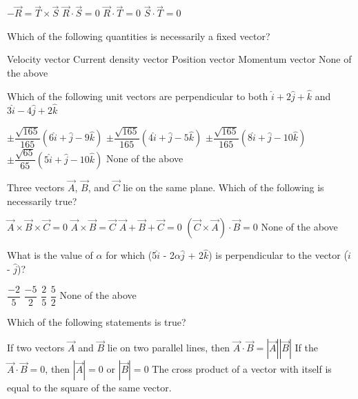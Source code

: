 \documentclass[12pt,addpoints]{exam}
\begin{document}
{{{\begin{questions}
\begin{oneparchoices}
						\choice $-\vec{R}=\vec{T}\times\vec{S}$
						\choice $\vec{R}\cdot\vec{S}=0$
						\choice $\vec{R}\cdot\vec{T}=0$
						\choice $\vec{S}\cdot\vec{T}=0$
					\end{oneparchoices}
					\question Which of the following quantities is necessarily a fixed vector? \\
					\begin{oneparchoices}
						\choice Velocity vector
						\choice Current density vector
						\choice Position vector
						\choice Momentum vector
						\choice None of the above
					\end{oneparchoices}
					\question Which of the following unit vectors are perpendicular to both $\hat{i}+2\hat{j}+\hat{k}$ and $3\hat{i}-4\hat{j}+2\hat{k}$
					\begin{oneparchoices}
						\choice $\pm\dfrac{\sqrt{165}}{165}(6\hat{i}+\hat{j}-9\hat{k})$
						\choice $\pm\dfrac{\sqrt{165}}{165}(4\hat{i}+\hat{j}-5\hat{k})$
						\choice $\pm\dfrac{\sqrt{165}}{165}(8\hat{i}+\hat{j}-10\hat{k})$
						\choice $\pm\dfrac{\sqrt{65}}{65}(5\hat{i}+\hat{j}-10\hat{k})$
						\choice None of the above
					\end{oneparchoices}
					\question Three vectors $\vec{A}$, $\vec{B}$, and $\vec{C}$ lie on the same plane. Which of the following is necessarily true?
					\begin{oneparchoices}
						\choice $\vec{A}\times\vec{B}\times\vec{C}=0$
						\choice $\vec{A}\times\vec{B}=\vec{C}$
						\choice $\vec{A}+\vec{B}+\vec{C}=0$
						\choice $(\vec{C}\times\vec{A})\cdot\vec{B}=0$
						\choice None of the above
					\end{oneparchoices}
					\question What is the value of $\alpha$ for which (5$\hat{i}$ - 2$\alpha$$\hat{j}$ + 2$\hat{k}$) is perpendicular to the vector ($\hat{i}$ - $\hat{j}$)? \\
					\begin{oneparchoices}
						\choice $\dfrac{-2}{5}$
						\choice $\dfrac{-5}{2}$
						\choice $\dfrac{2}{5}$
						\choice $\dfrac{5}{2}$
						\choice None of the above
					\end{oneparchoices} 
					\question Which of the following statements is true?
					\begin{choices}
						\choice If two vectors $\vec{A}$ and $\vec{B}$ lie on two parallel lines, then $\vec{A}\cdot\vec{B}=|\vec{A}||\vec{B}|$
						\choice If the $\vec{A}\cdot\vec{B}=0$, then $|\vec{A}|=0$ or $|\vec{B}|=0$
						\choice The cross product of a vector with itself is equal to the
						square of the same vector. 

\end{choices}$$
\end{questions}}}}
\end{document}
